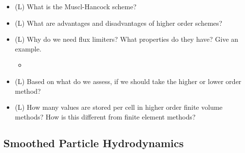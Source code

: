 \begin{itemize}
\begin{itemize}
{        to get to second order accuracy in time and for stability reasons.}
    \end{itemize}
    \item (L) What is the Muscl-Hancock scheme?
    \item (L) What are advantages and disadvantages of higher order schemes?
    \item (L) Why do we need flux limiters? What properties do they have? Give an example.
    \begin{itemize}
        \item {}
    \end{itemize}
    \item (L) Based on what do we assess, if we should take the higher or lower order method?
    \item (L) How many values are stored per cell in higher order finite volume methods? How is this
    different from finite element methods?
\end{itemize}

\subsection*{Smoothed Particle Hydrodynamics}

